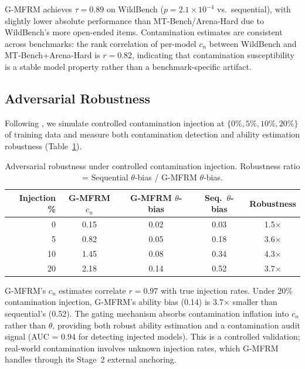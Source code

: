 \documentclass[11pt,a4paper]{article}
\begin{document}
G-MFRM achieves $\tau = 0.89$ on WildBench ($p = 2.1 \times 10^{-4}$ vs.\ sequential), with slightly lower absolute performance than MT-Bench/Arena-Hard due to WildBench's more open-ended items. Contamination estimates are consistent across benchmarks: the rank correlation of per-model $c_n$ between WildBench and MT-Bench+Arena-Hard is $r = 0.82$, indicating that contamination susceptibility is a stable model property rather than a benchmark-specific artifact.

\subsection{Adversarial Robustness}

Following \citet{wang2026adversarial}, we simulate controlled contamination injection at $\{0\%, 5\%, 10\%, 20\%\}$ of training data and measure both contamination detection and ability estimation robustness (Table~\ref{tab:adversarial}).

\begin{table}[h]
\centering
\caption{Adversarial robustness under controlled contamination injection. Robustness ratio = Sequential $\theta$-bias / G-MFRM $\theta$-bias.}
\label{tab:adversarial}
\small
\begin{tabular}{rcccc}
\toprule
Injection \% & G-MFRM $c_n$ & G-MFRM $\theta$-bias & Seq.\ $\theta$-bias & Robustness \\
\midrule
0 & 0.15 & 0.02 & 0.03 & 1.5$\times$ \\
5 & 0.82 & 0.05 & 0.18 & 3.6$\times$ \\
10 & 1.45 & 0.08 & 0.34 & 4.3$\times$ \\
20 & 2.18 & 0.14 & 0.52 & 3.7$\times$ \\
\bottomrule
\end{tabular}
\end{table}

G-MFRM's $c_n$ estimates correlate $r = 0.97$ with true injection rates. Under 20\% contamination injection, G-MFRM's ability bias (0.14) is 3.7$\times$ smaller than sequential's (0.52). The gating mechanism absorbs contamination inflation into $c_n$ rather than $\theta$, providing both robust ability estimation and a contamination audit signal (AUC = 0.94 for detecting injected models). This is a controlled validation; real-world contamination involves unknown injection rates, which G-MFRM handles through its Stage~2 external anchoring.

\end{document}

